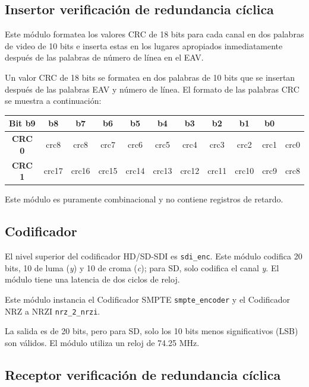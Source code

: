 \subsection{Insertor verificación de redundancia cíclica}

Este módulo formatea los valores CRC de 18 bits para cada canal en dos palabras
de video de 10 bits e inserta estas en los lugares apropiados inmediatamente
después de las palabras de número de línea en el EAV\@.

Un valor CRC de 18 bits se formatea en dos palabras de 10 bits que se insertan
después de las palabras EAV y número de línea. El formato de las palabras CRC
se muestra a continuación:

\begin{center}
  \begin{tabular}{|c|c|c|c|c|c|c|c|c|c|c|}
    \hline
    \textbf{Bit} b9 & b8 & b7 & b6 & b5 & b4 & b3 & b2 & b1 & b0 \\
    \hline
    \textbf{CRC 0} & crc8 & crc8 & crc7 & crc6 & crc5 & crc4 & crc3 & crc2 & crc1 & crc0 \\
    \hline
    \textbf{CRC 1} & crc17 & crc16 & crc15 & crc14 & crc13 & crc12 & crc11 & crc10 & crc9 & crc8 \\
    \hline
  \end{tabular}
\end{center}

Este módulo es puramente combinacional y no contiene registros de retardo.

\subsection{Codificador}

  El nivel superior del codificador HD/SD-SDI es \texttt{sdi\_enc}. Este módulo
  codifica 20 bits, 10 de luma (\textit{y}) y 10 de croma (\textit{c}); para SD,
  solo codifica el canal \textit{y}. El módulo tiene una latencia de dos ciclos
  de reloj.

  Este módulo instancia el Codificador SMPTE \texttt{smpte\_encoder} y el
  Codificador NRZ a NRZI \texttt{nrz\_2\_nrzi}.

  La salida es de 20 bits, pero para SD, solo los 10 bits menos significativos
  (LSB) son válidos. El módulo utiliza un reloj de 74.25 MHz.

\subsection{Receptor verificación de redundancia cíclica}


